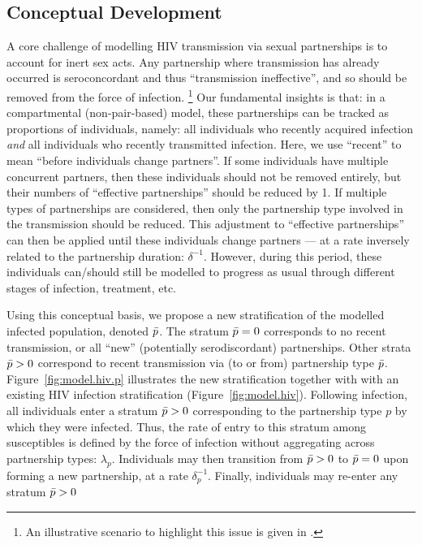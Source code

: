\subsection{Conceptual Development}\label{foi.prop.concept}
A core challenge of modelling HIV transmission via sexual partnerships is
to account for inert sex acts.
Any partnership where transmission has already occurred
is seroconcordant and thus ``transmission ineffective'',
and so should be removed from the force of infection.%
\footnote{An illustrative scenario to highlight this issue is given in .}
Our fundamental insights is that:
in a compartmental (non-pair-based) model,
these partnerships can be tracked as proportions of individuals, namely:
all individuals who recently acquired infection \emph{and}
all individuals who recently transmitted infection.
Here, we use ``recent'' to mean ``before individuals change partners''.
If some individuals have multiple concurrent partners,
then these individuals should not be removed entirely,
but their numbers of ``effective partnerships'' should be reduced by 1.
If multiple types of partnerships are considered,
then only the partnership type involved in the transmission should be reduced.
This adjustment to ``effective partnerships'' can then be applied
until these individuals change partners
--- at a rate inversely related to the partnership duration: $\delta^{-1}$.
However, during this period, these individuals can/should still be modelled
to progress as usual through different stages of infection, treatment, etc.
\par
Using this conceptual basis,
we propose a new stratification of the modelled infected population, denoted $\bar{p}$.
The stratum $\bar{p} = 0$ corresponds to no recent transmission,
or all ``new'' (potentially serodiscordant) partnerships.
Other strata $\bar{p} > 0$ correspond to recent transmission via (to or from) partnership type $\bar{p}$.
Figure~\ref{fig:model.hiv.p} illustrates the new stratification
together with with an existing HIV infection stratification (Figure~\ref{fig:model.hiv}).
Following infection, all individuals enter a stratum $\bar{p} > 0$
corresponding to the partnership type $p$ by which they were infected.
Thus, the rate of entry to this stratum among susceptibles is defined by
the force of infection without aggregating across partnership types: $\lambda_{p}$.
Individuals may then transition from $\bar{p} > 0$ to $\bar{p} = 0$
upon forming a new partnership, at a rate $\delta_p^{-1}$.
Finally, individuals may re-enter any stratum $\bar{p} > 0$
